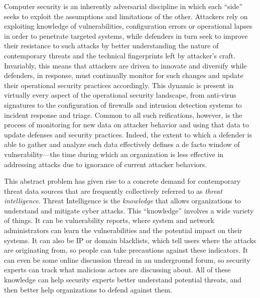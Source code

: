\begin{dissertationintroduction}

Computer security is an inherently adversarial discipline in which
each ``side'' seeks to exploit the assumptions and limitations of the
other.  Attackers rely on exploiting knowledge of vulnerabilities,
configuration errors or operational lapses in order to penetrate
targeted systems, while defenders in turn seek to improve their
resistance to such attacks by better understanding the nature of
contemporary threats and the technical fingerprints left by attacker's
craft.  Invariably, this means that attackers are driven to innovate
and diversify while defenders, in response, must continually monitor
for such changes and update their operational security practices
accordingly.  This dynamic is present in virtually every aspect of the
operational security landscape, from anti-virus signatures to the
configuration of firewalls and intrusion detection systems to incident
response and triage.  Common to all such reifications, however, is the
process of monitoring for new data on attacker behavior and using that
data to update defenses and security practices. Indeed, the extent to
which a defender is able to gather and analyze such data effectively
defines a de facto window of vulnerability---the time during which an
organization is less effective in addressing attacks due to ignorance
of current attacker behaviors.

This abstract problem has given rise to a concrete demand for
contemporary threat data sources that are frequently collectively
referred to as \emph{threat intelligence}. Threat Intelligence 
is the \emph{knowledge} that allows organizations to understand and 
mitigate cyber attacks. This ``knowledge'' involves a wide variety 
of things. It can be vulnerability reports, where system and 
network administrators can learn the vulnerabilities and the potential
impact on their systems. It can also be IP or domain blacklists,
which tell users where the attacks are originating from, so people
can take precautions against these indicators. It can even be some 
online discussion thread in an underground forum, so security 
experts can track what malicious actors are discussing about. 
All of these knowledge can help security experts better understand 
potential threats, and then better help organizations to defend 
against them.


\end{dissertationintroduction}

